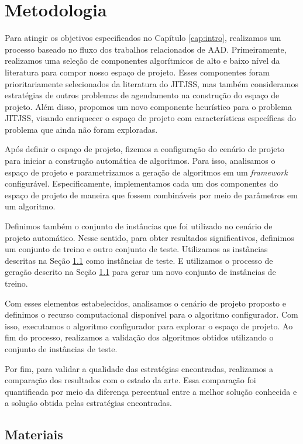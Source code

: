 ﻿\chapter{Metodologia} \label{chapt:metodologia}

Para atingir os objetivos especificados no Capítulo \ref{cap:intro}, realizamos um processo baseado no fluxo dos trabalhos relacionados de \ac{AAD}. Primeiramente, realizamos uma seleção de componentes algorítmicos de alto e baixo nível da literatura para compor nosso espaço de projeto. Esses componentes foram prioritariamente selecionados da literatura do \ac{JITJSS}, mas também consideramos estratégias de outros problemas de agendamento na construção do espaço de projeto. Além disso, propomos um novo componente heurístico para o problema \ac{JITJSS}, visando enriquecer o espaço de projeto com características específicas do problema que ainda não foram exploradas.

Após definir o espaço de projeto, fizemos a configuração do cenário de projeto para iniciar a construção automática de algoritmos. Para isso, analisamos o espaço de projeto e parametrizamos a geração de algoritmos em um \textit{framework} configurável. Especificamente, implementamos cada um dos componentes do espaço de projeto de maneira que fossem combináveis por meio de parâmetros em um algoritmo.

Definimos também o conjunto de instâncias que foi utilizado no cenário de projeto automático. Nesse sentido, para obter resultados significativos, definimos um conjunto de treino e outro conjunto de teste. Utilizamos as instâncias descritas na Seção \ref{sect:materiais} como instâncias de teste. E utilizamos o processo de geração descrito na Seção \ref{sect:materiais} para gerar um novo conjunto de instâncias de treino.

Com esses elementos estabelecidos, analisamos o cenário de projeto proposto e definimos o recurso computacional disponível para o algoritmo configurador. Com isso, executamos o algoritmo configurador para explorar o espaço de projeto. Ao fim do processo, realizamos a validação dos algoritmos obtidos utilizando o conjunto de instâncias de teste.

Por fim, para validar a qualidade das estratégias encontradas, realizamos a comparação dos resultados com o estado da arte. Essa comparação foi quantificada por meio da diferença percentual entre a melhor solução conhecida e a solução obtida pelas estratégias encontradas.

\section{Materiais} \label{sect:materiais}

